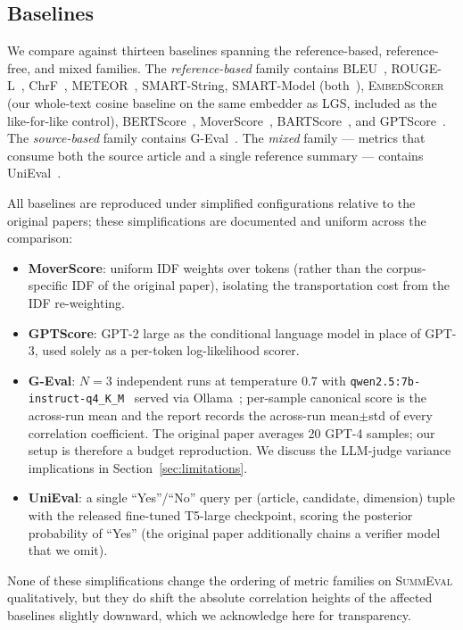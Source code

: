 \documentclass[journal]{IEEEtran}
\begin{document}
\subsection{Baselines}
We compare against thirteen baselines spanning the reference-based,
reference-free, and mixed families. The \emph{reference-based}
family contains BLEU~\cite{papineni2002bleu},
ROUGE-L~\cite{lin2004rouge}, ChrF~\cite{popovic2015chrf},
METEOR~\cite{banerjee2005meteor}, SMART-String, SMART-Model
(both~\cite{amplayo2022smart}),
\textsc{EmbedScorer} (our whole-text cosine baseline on the same
embedder as LGS, included as the like-for-like control),
BERTScore~\cite{zhang2020bertscore},
MoverScore~\cite{zhao2019moverscore},
BARTScore~\cite{yuan2021bartscore}, and
GPTScore~\cite{fu2023gptscore}. The \emph{source-based} family
contains G-Eval~\cite{liu2023geval}. The \emph{mixed} family ---
metrics that consume both the source article and a single
reference summary --- contains UniEval~\cite{zhong2022unieval}.

All baselines are reproduced under simplified configurations
relative to the original papers; these simplifications are
documented and uniform across the comparison:
\begin{itemize}
\item \textbf{MoverScore}: uniform IDF weights over tokens
(rather than the corpus-specific IDF of the original paper),
isolating the transportation cost from the IDF re-weighting.
\item \textbf{GPTScore}: GPT-2 large as the conditional language
model in place of GPT-3, used solely as a per-token
log-likelihood scorer.
\item \textbf{G-Eval}: $N{=}3$ independent runs at temperature
$0.7$ with \texttt{qwen2.5:7b-instruct-q4\_K\_M}~\cite{qwen2024}
served via Ollama~\cite{ollama2024}; per-sample canonical score
is the across-run mean and the report records the across-run
mean$\pm$std of every correlation coefficient. The original paper
averages 20 GPT-4 samples; our setup is therefore a budget
reproduction. We discuss the LLM-judge variance implications in
Section~\ref{sec:limitations}.
\item \textbf{UniEval}: a single ``Yes''/``No'' query per
(article, candidate, dimension) tuple with the released
fine-tuned T5-large checkpoint, scoring the posterior probability
of ``Yes'' (the original paper additionally chains a verifier
model that we omit).
\end{itemize}
None of these simplifications change the ordering of metric
families on \textsc{SummEval} qualitatively, but they do shift
the absolute correlation heights of the affected baselines
slightly downward, which we acknowledge here for transparency.
\end{document}
